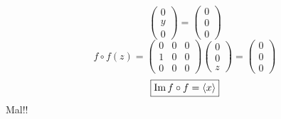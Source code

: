 \documentclass[../practica.root.tex]{subfiles}
\begin{document}
\begin{enumerate}
\[\begin{pmatrix}
                  0 \\ y \\ 0
              \end{pmatrix} = \begin{pmatrix}
                  0 \\ 0 \\ 0
              \end{pmatrix}
          \] \[
              f \circ f(z) = \begin{pmatrix}
                  0 & 0 & 0 \\
                  1 & 0 & 0 \\
                  0 & 0 & 0
              \end{pmatrix}\begin{pmatrix}
                  0 \\ 0 \\ z
              \end{pmatrix} = \begin{pmatrix}
                  0 \\ 0 \\ 0
              \end{pmatrix}
          \] \[
              \boxed{\operatorname{Im} f \circ f = \langle x \rangle}
          \]
          Mal!!


\end{enumerate}
\end{document}
